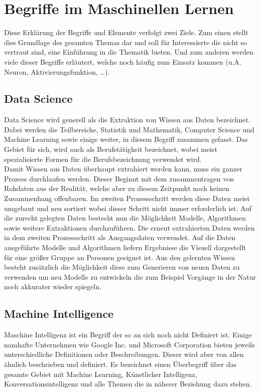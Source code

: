 \chapter{Begriffe im Maschinellen Lernen}
\label{cha:Begriffe}

Diese Erklärung der Begriffe und Elemente verfolgt zwei Ziele.
Zum einen stellt dies Grundlage des gesamten Themas dar und soll für Interessierte die nicht so vertraut sind, eine Einführung in die Thematik bieten. Und zum anderen werden viele dieser Begriffe erläutert, welche noch häufig zum Einsatz kommen (u.A. Neuron, Aktivierungsfunktion, …).

\section{Data Science}

Data Science wird generell als die Extraktion von Wissen aus Daten bezeichnet. Dabei werden die Teilbereiche, Statistik und Mathematik, Computer Science und Machine Learning sowie einige weiter, in diesem Begriff zusammen gefasst. Das Gebiet für sich, wird auch als Berufstätigkeit bezeichnet, wobei meist spezialisierte Formen für die Berufsbezeichnung verwendet wird.\\

Damit Wissen aus Daten überhaupt extrahiert werden kann, muss ein ganzer Prozess durchlaufen werden. Dieser Beginnt mit dem zusammentragen von Rohdaten aus der Realität, welche aber zu diesem Zeitpunkt noch keinen Zusammenhang offenbaren. Im zweiten Prozessschritt werden diese Daten meist umgebaut und neu sortiert wobei dieser Schritt nicht immer erforderlich ist. Auf die  zurecht gelegten Daten bestecht nun die Möglichkeit Modelle, Algorithmen sowie weitere Extraktionen durchzuführen. Die erneut extrahierten Daten werden in dem zweiten Prozessschritt als Ausgangsdaten verwendet. Auf die Daten ausgeführte Modelle und Algorithmen liefern Ergebnisse die Visuell dargestellt für eine größer Gruppe an Personen geeignet ist. Aus den gelernten Wissen besteht zusätzlich die Möglichkeit diese zum Generieren von neuen Daten zu verwenden um neu Modelle zu entwickeln die zum Beispiel Vorgänge in der Natur noch akkurater wieder spiegeln.

\section{Machine Intelligence}

Maschine Intelligenz ist ein Begriff der so an sich noch nicht Definiert ist. Einige namhafte Unternehmen wie Google Inc. und Microsoft Corporation bieten jeweils unterschiedliche Definitionen oder Beschreibungen. Dieser wird aber von allen ähnlich beschrieben und definiert. Es bezeichnet einen Überbegriff über das gesamte Gebiet mit Machine Learning, Künstlicher Intelligenz, Konversationsintelligenz und alle Themen die in näherer Beziehung dazu stehen. 

